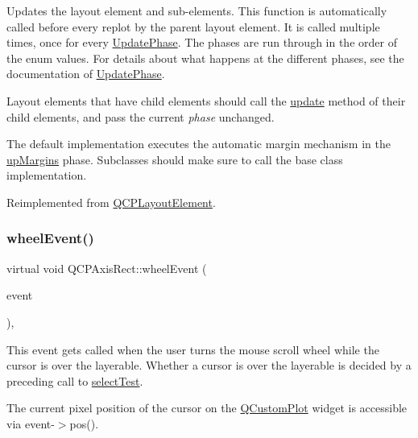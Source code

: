 Updates the layout element and sub-\/elements. This function is automatically called before every replot by the parent layout element. It is called multiple times, once for every \hyperlink{class_q_c_p_layout_element_a0d83360e05735735aaf6d7983c56374d}{Update\+Phase}. The phases are run through in the order of the enum values. For details about what happens at the different phases, see the documentation of \hyperlink{class_q_c_p_layout_element_a0d83360e05735735aaf6d7983c56374d}{Update\+Phase}.

Layout elements that have child elements should call the \hyperlink{class_q_c_p_axis_rect_add049d464b9ef2ccdc638adc4ccb4aca}{update} method of their child elements, and pass the current {\itshape phase} unchanged.

The default implementation executes the automatic margin mechanism in the \hyperlink{class_q_c_p_layout_element_a0d83360e05735735aaf6d7983c56374dae1924e6bd8696f20d2eb224d8084a268}{up\+Margins} phase. Subclasses should make sure to call the base class implementation. 

Reimplemented from \hyperlink{class_q_c_p_layout_element_a929c2ec62e0e0e1d8418eaa802e2af9b}{Q\+C\+P\+Layout\+Element}.

\mbox{\label{class_q_c_p_axis_rect_a2ca1c7bf10a472147df1b7d7bc6bfe93}} 
\subsubsection{\texorpdfstring{wheel\+Event()}{wheelEvent()}\hspace{0.1cm}{\footnotesize\ttfamily [1/2]}}
{\footnotesize\ttfamily virtual void Q\+C\+P\+Axis\+Rect\+::wheel\+Event (\begin{DoxyParamCaption}\item[{Q\+Wheel\+Event $\ast$}]{event }\end{DoxyParamCaption})\hspace{0.3cm}{\ttfamily [protected]}, {\ttfamily [virtual]}}

This event gets called when the user turns the mouse scroll wheel while the cursor is over the layerable. Whether a cursor is over the layerable is decided by a preceding call to \hyperlink{class_q_c_p_layout_element_ae97f483cccedadbf18ea4525ef240ee4}{select\+Test}.

The current pixel position of the cursor on the \hyperlink{class_q_custom_plot}{Q\+Custom\+Plot} widget is accessible via {\ttfamily event-\/$>$pos()}.

